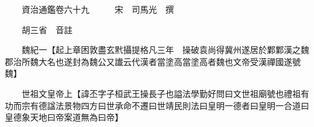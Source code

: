 










 


 
 


 

  
  
  
  
  





  
  
  
  
  
 
  

  

  
  
  



  

 
 

  
   




  

  
  


  　　資治通鑑卷六十九　　　宋　司馬光　撰

　　胡三省　音註

　　魏紀一【起上章困敦盡玄黓攝提格凡三年　操破袁尚得冀州遂居於鄴鄴漢之魏郡治所魏大名也遂封為魏公又䜟云代漢者當塗高當塗高者魏也文帝受漢禪國遂號魏】

　　世祖文皇帝上【諱丕字子桓武王操長子也謚法學勤好問曰文世祖廟號也禮祖有功而宗有德諡法景物四方曰世承命不遷曰世靖民則法曰皇明一德者曰皇明一合道曰皇德象天地曰帝案道無為曰帝】

